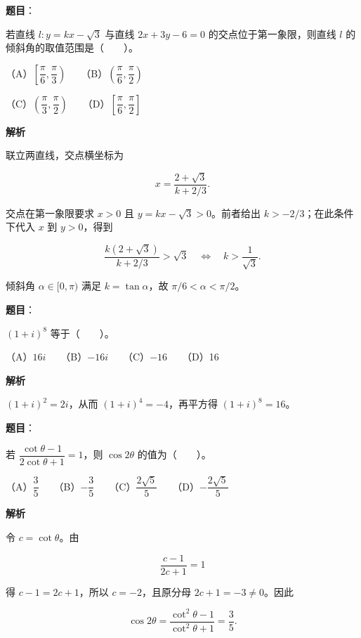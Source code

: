 \begin{answer}

\textbf{题目}：

若直线 \(l:y=kx-\sqrt3\) 与直线 \(2x+3y-6=0\) 的交点位于第一象限，则直线 \(l\) 的倾斜角的取值范围是\mbox{（　　）}。

（A）\(\left[\dfrac\pi6,\dfrac\pi3\right)\)　　（B）\(\left(\dfrac\pi6,\dfrac\pi2\right)\)

（C）\(\left(\dfrac\pi3,\dfrac\pi2\right)\)　　（D）\(\left[\dfrac\pi6,\dfrac\pi2\right]\)

\textbf{解析}

联立两直线，交点横坐标为

\nopagebreak[4]
\[x=\frac{2+\sqrt3}{k+2/3}.\]

交点在第一象限要求 $x>0$ 且 $y=kx-\sqrt3>0$。前者给出 $k>-2/3$；在此条件下代入 $x$ 到 $y>0$，得到

\nopagebreak[4]
\[\frac{k(2+\sqrt3)}{k+2/3}>\sqrt3\quad\Longleftrightarrow\quad k>\frac1{\sqrt3}.\]

倾斜角 $\alpha\in[0,\pi)$ 满足 $k=\tan\alpha$，故 $\pi/6<\alpha<\pi/2$。


\end{answer}
\begin{answer}

\textbf{题目}：

\((1+i)^8\) 等于\mbox{（　　）}。

（A）\(16i\)　　（B）\(-16i\)　　（C）\(-16\)　　（D）16

\textbf{解析}

$(1+i)^2=2i$，从而 $(1+i)^4=-4$，再平方得 $(1+i)^8=16$。


\end{answer}
\begin{answer}

\textbf{题目}：

若 \(\dfrac{\cot\theta-1}{2\cot\theta+1}=1\)，则 \(\cos2\theta\) 的值为\mbox{（　　）}。

（A）\(\dfrac{3}{5}\)　　（B）\(-\dfrac{3}{5}\)　　（C）\(\dfrac{2\sqrt5}{5}\)　　（D）\(-\dfrac{2\sqrt5}{5}\)

\textbf{解析}

令 $c=\cot\theta$。由

\nopagebreak[4]
\[\frac{c-1}{2c+1}=1\]

得 $c-1=2c+1$，所以 $c=-2$，且原分母 $2c+1=-3\ne0$。因此

\nopagebreak[4]
\[\cos2\theta=\frac{\cot^2\theta-1}{\cot^2\theta+1}=\frac35.\]


\end{answer}
